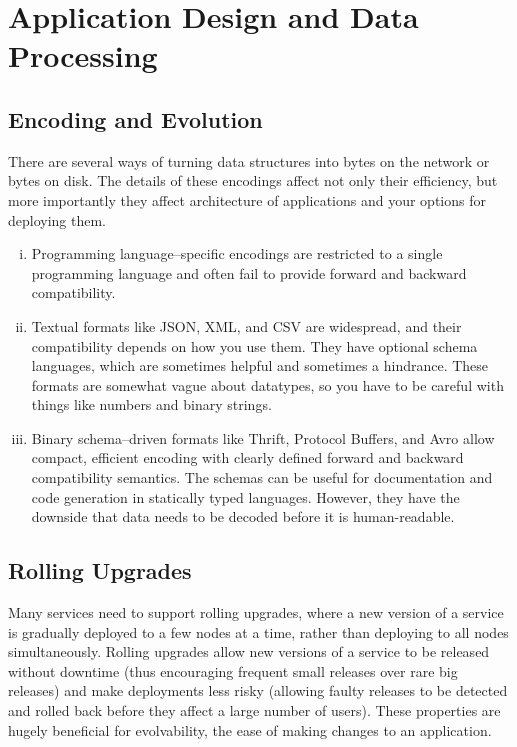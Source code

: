 \documentclass{article}
\begin{document}
\section{Application Design and Data Processing}
    \subsection{Encoding and Evolution}
    There are several ways of turning data structures into bytes on the network or bytes on disk. The details of these encodings affect not only their efficiency, but more importantly they affect architecture of applications and your options for deploying them.
    
    \begin{enumerate}[i.]
        \item Programming language–specific encodings are restricted to a single programming language and often fail to provide forward and backward compatibility.
        \item Textual formats like JSON, XML, and CSV are widespread, and their compatibility depends on how you use them. They have optional schema languages, which are sometimes helpful and sometimes a hindrance. These formats are somewhat vague about datatypes, so you have to be careful with things like numbers and  binary strings.
        \item Binary schema–driven formats like Thrift, Protocol Buffers, and Avro allow compact, efficient encoding with clearly defined forward and backward compatibility semantics. The schemas can be useful for documentation and code generation in statically typed languages. However, they have the downside that data   needs to be decoded before it is human-readable.
    \end{enumerate}
    
    \subsection{Rolling Upgrades}
    Many services need to support rolling upgrades, where a new version of a service is gradually deployed to a few nodes at a time, rather than deploying to all nodes simultaneously. Rolling upgrades allow new versions of a service to be released without downtime (thus encouraging frequent small releases over rare big releases) and make deployments less risky (allowing faulty releases to be detected and rolled back before they affect a large number of users). These properties are hugely beneficial for evolvability, the ease of making changes to an application.
    
\end{document}
